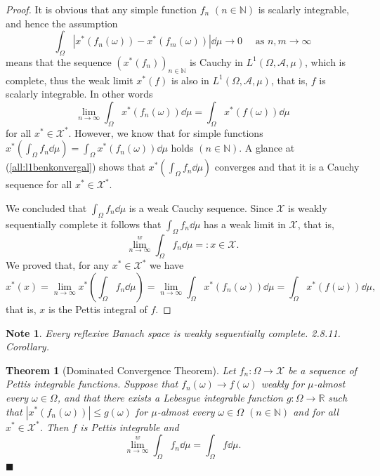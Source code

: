 \documentclass[a4paper, 12pt]{article}
\newtheorem{theo}[lem]{Theorem}
\newtheorem{note}[lem]{Note}
\newcommand*{\qedb}{\hfill\ensuremath{\blacksquare}}
\begin{document}
\begin{proof} It is obvious that any simple function $f_n$ $(n \in \mathbb{N})$ is scalarly integrable, and hence the assumption
$$
\int_{\Omega} |x^*(f_n(\omega)) - x^*(f_m(\omega))| \dd{\mu} \to 0 \quad \text{ as } n,m \to \infty
$$
means that the sequence $(x^*(f_n))_{n \in \mathbb{N}}$ is Cauchy in $L^1(\Omega, \mathcal{A}, \mu)$, which is complete, thus the weak limit $x^*(f)$ is also in $L^1(\Omega, \mathcal{A}, \mu)$, that is, $f$ is scalarly integrable.
In other words
\begin{equation}\label{all:l1benkonvergal}
\lim_{n \to \infty} \int_{\Omega} x^*(f_n(\omega)) \dd{\mu} = \int_{\Omega} x^*(f(\omega)) \dd{\mu}
\end{equation}
for all $x^* \in \mathcal{X}^*$. However, we know that for simple functions $x^*(\int_{\Omega} f_n \dd{\mu}) = \int_{\Omega} x^*(f_n(\omega)) \dd{\mu}$ holds $(n \in \mathbb{N})$. A glance at (\ref{all:l1benkonvergal}) shows that $x^*(\int_{\Omega} f_n \dd{\mu})$ converges and that it is a Cauchy sequence for all $x^* \in \mathcal{X}^*$.

We concluded that $\int_{\Omega} f_n \dd{\mu}$ is a weak Cauchy sequence. Since $\mathcal{X}$ is weakly sequentially complete it follows that $\int_{\Omega} f_n \dd{\mu}$ has a weak limit in $\mathcal{X}$, that is,
$$
\lim^{w}_{n \to \infty} \int_{\Omega} f_n \dd{\mu} =: x \in \mathcal{X}.
$$
We proved that, for any $x^* \in \mathcal{X}^*$ we have
$$
x^*(x) = \lim_{n \to \infty} x^*\left(\int_{\Omega} f_n \dd{\mu} \right) =  \lim_{n \to \infty} \int_{\Omega} x^*(f_n(\omega)) \dd{\mu} = \int_{\Omega} x^*(f(\omega)) \dd{\mu},
$$
that is, $x$ is the Pettis integral of $f$.
\end{proof}
\begin{note}\normalfont Every reflexive Banach space is weakly sequentially complete. \cite{megginson} \textit{2.8.11. Corollary}.
\end{note}
\begin{theo}[Dominated Convergence Theorem] Let $f_n \colon \Omega \rightarrow \mathcal{X}$ be a sequence of Pettis integrable functions. Suppose that $f_n(\omega) \rightarrow f(\omega)$ weakly for $\mu$-almost every $\omega \in \Omega$, and that there exists a Lebesgue integrable function $g \colon \Omega \rightarrow \mathbb{R}$ such that $|x^*(f_n(\omega))| \leqslant g(\omega)$ for $\mu$-almost every $\omega \in \Omega$ $(n \in \mathbb{N})$ and for all $x^* \in \mathcal{X}^*$. Then $f$ is Pettis integrable and 
$$\lim^{w}_{n \to \infty} \int_{\Omega} f_n \dd{\mu} = \int_{\Omega} f \dd{\mu}.$$ \qedb
\end{theo}
\end{document}
